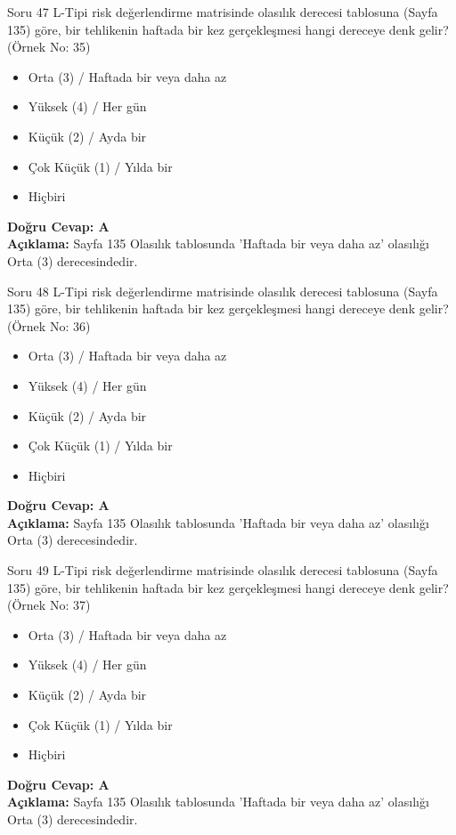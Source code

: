 \documentclass[12pt,a4paper]{article}
\begin{document}
\begin{testcard}{Soru 47}
    L-Tipi risk değerlendirme matrisinde olasılık derecesi tablosuna (Sayfa 135) göre, bir tehlikenin haftada bir kez gerçekleşmesi hangi dereceye denk gelir? (Örnek No: 35)
    \begin{itemize}
        \item[A)] Orta (3) / Haftada bir veya daha az
        \item[B)] Yüksek (4) / Her gün
        \item[C)] Küçük (2) / Ayda bir
        \item[D)] Çok Küçük (1) / Yılda bir
        \item[E)] Hiçbiri
    \end{itemize}
    \tcblower
    \textbf{Doğru Cevap: A} \\
    \textbf{Açıklama:} Sayfa 135 Olasılık tablosunda 'Haftada bir veya daha az' olasılığı Orta (3) derecesindedir.
\end{testcard}

\begin{testcard}{Soru 48}
    L-Tipi risk değerlendirme matrisinde olasılık derecesi tablosuna (Sayfa 135) göre, bir tehlikenin haftada bir kez gerçekleşmesi hangi dereceye denk gelir? (Örnek No: 36)
    \begin{itemize}
        \item[A)] Orta (3) / Haftada bir veya daha az
        \item[B)] Yüksek (4) / Her gün
        \item[C)] Küçük (2) / Ayda bir
        \item[D)] Çok Küçük (1) / Yılda bir
        \item[E)] Hiçbiri
    \end{itemize}
    \tcblower
    \textbf{Doğru Cevap: A} \\
    \textbf{Açıklama:} Sayfa 135 Olasılık tablosunda 'Haftada bir veya daha az' olasılığı Orta (3) derecesindedir.
\end{testcard}

\begin{testcard}{Soru 49}
    L-Tipi risk değerlendirme matrisinde olasılık derecesi tablosuna (Sayfa 135) göre, bir tehlikenin haftada bir kez gerçekleşmesi hangi dereceye denk gelir? (Örnek No: 37)
    \begin{itemize}
        \item[A)] Orta (3) / Haftada bir veya daha az
        \item[B)] Yüksek (4) / Her gün
        \item[C)] Küçük (2) / Ayda bir
        \item[D)] Çok Küçük (1) / Yılda bir
        \item[E)] Hiçbiri
    \end{itemize}
    \tcblower
    \textbf{Doğru Cevap: A} \\
    \textbf{Açıklama:} Sayfa 135 Olasılık tablosunda 'Haftada bir veya daha az' olasılığı Orta (3) derecesindedir.
\end{testcard}
\end{document}
